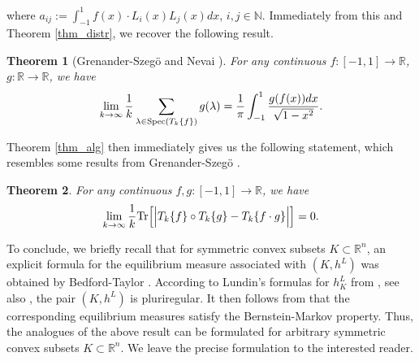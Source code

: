 \documentclass[12pt]{article}
\numberwithin{equation}{section}
\theoremstyle{theorem}
\newtheorem{thm}{Theorem}[section]
\theoremstyle{definition}
\theoremstyle{remark}
\newcommand{\real}{\mathbb{R}}
\newcommand{\nat}{\mathbb{N}}
\begin{document}
	where $a_{i j} := \int_{-1}^{1} f(x) \cdot L_i(x) L_j(x) dx$, $i, j \in \nat$.
	Immediately from this and Theorem \ref{thm_distr}, we recover the following result.
	\begin{thm}[{Grenander-Szeg{\"o} \cite[p. 116]{GrenanSzego} and Nevai \cite[\S 5]{Nevai}}]
		For any continuous $f : [-1, 1] \to \real$, $g: \real \to \real$, we have
		\begin{equation}
			\lim_{k \to \infty} \frac{1}{k} \sum_{\lambda \in {\rm{Spec}} (T_k\{ f \})} g(\lambda)
			=
			\frac{1}{\pi}
			\int_{-1}^{1} \frac{g(f(x)) dx}{\sqrt{1 - x^2}}.
		\end{equation}
	\end{thm}
	\par 
	Theorem \ref{thm_alg} then immediately gives us the following statement, which resembles some results from {Grenander-Szeg{\"o} \cite[\S 8.1]{GrenanSzego}}.
	\begin{thm}
		For any continuous $f, g : [-1, 1] \to \real$, we have
		\begin{equation}
			\lim_{k \to \infty} \frac{1}{k} {\rm{Tr}} \Big[ \Big| T_k\{ f \} \circ T_k\{ g \} - T_k \{ f \cdot g \} \Big| \Big]
			=
			0.
		\end{equation}
	\end{thm}
	\par 
	To conclude, we briefly recall that for symmetric convex subsets $K \subset \mathbb{R}^n$, an explicit formula for the equilibrium measure associated with $(K, h^L)$ was obtained by Bedford-Taylor \cite{BedfordTaylorEquil}. 
	According to Lundin's formulas for $h^L_K$ from \cite{Lundin}, see also \cite[p. 707]{BedfordTaylorEquil}, the pair $(K, h^L)$ is pluriregular. 
	It then follows from \cite[Proposition 1.13 and Theorem 1.14]{BerBoucNys} that the corresponding equilibrium measures satisfy the Bernstein-Markov property.  
	Thus, the analogues of the above result can be formulated for arbitrary symmetric convex subsets $K \subset \mathbb{R}^n$.
	We leave the precise formulation to the interested reader.

	
	
\end{document}
